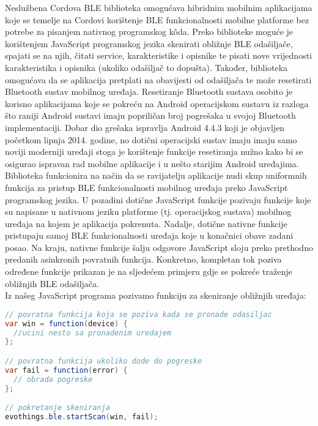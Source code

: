 Neslužbena Cordova BLE biblioteka omogućava hibridnim mobilnim aplikacijama koje se temelje na Cordovi korištenje BLE funkcionalnosti mobilne platforme bez potrebe za pisanjem nativnog programskog kôda. 
Preko biblioteke moguće je korištenjem JavaScript programskog jezika skenirati obližnje BLE odašiljače, spajati se na njih, čitati service, karakteristike i opisnike te pisati nove vrijednosti karakteristika i opisnika (ukoliko odašiljač to dopušta). 
Također, biblioteka omogućava da se aplikacija pretplati na obavijesti od odašiljača te može resetirati Bluetooth sustav mobilnog uređaja. 
Resetiranje Bluetooth sustava osobito je korisno aplikacijama koje se pokreću na Android operacijskom sustavu iz razloga što raniji Android sustavi imaju popriličan broj pogrešaka u svojoj Bluetooth implementaciji. 
Dobar dio grešaka ispravlja Android 4.4.3 koji je objavljen početkom lipnja 2014. godine, no dotični operacijski sustav imaju imaju samo noviji moderniji uređaji stoga je korištenje funkcije resetiranja nužno kako bi se osigurao ispravan rad mobilne aplikacije i u nešto starijim Android uređajima.
\\

Biblioteka funkcionira na način da se ravijatelju aplikacije nudi skup uniformnih funkcija za pristup BLE funkcionalnosti mobilnog uređaja preko JavaScript programskog jezika. 
U pozadini dotične JavaScript funkcije pozivaju funkcije koje su napisane u nativnom jeziku platforme (tj. operacijskog sustava) mobilnog uređaja na kojem je aplikacija pokrenuta. 
Nadalje, dotične nativne funkcije pristupaju samoj BLE funkcionalnosti uređaja koje u konačnici obave zadani posao. 
Na kraju, nativne funkcije šalju odgovore JavaScript sloju preko prethodno predanih asinkronih povratnih funkcija.
Konkretno, kompletan tok poziva određene funkcije prikazan je na sljedećem primjeru gdje se pokreće traženje obližnjih BLE odašiljača.
\\

Iz našeg JavaScript programa pozivamo funkciju za skeniranje obližnjih uređaja:
\begin{lstlisting}[language=java, morekeywords={var,function}]
// povratna funkcija koja se poziva kada se pronade odasiljac
var win = function(device) {
  //ucini nesto sa pronadenim uredajem
};

// povratna funkcija ukoliko dode do pogreske
var fail = function(error) {
  // obrada pogreske
};

// pokretanje skeniranja
evothings.ble.startScan(win, fail);
\end{lstlisting}

